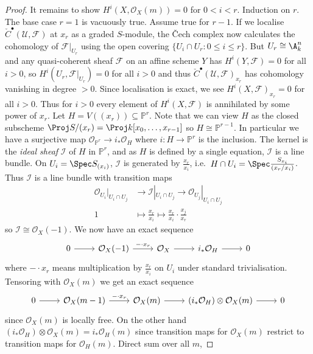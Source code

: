 \documentclass[a4paper]{article}
\renewcommand*{\P}{\mathbb{P}}
\newcommand{\sh}[1]{\mathcal{#1}} %
\begin{document}
\begin{proof}
  It remains to show \(H^i(X, \sh O_X(m)) = 0\) for \(0 < i < r\). Induction on \(r\). The base case \(r = 1\) is vacuously true. Assume true for \(r - 1\). If we localise \(\check C^\bullet(\mathcal U, \sh F)\) at \(x_r\) as a graded \(S\)-module, the Čech complex now calculates the cohomology of \(\sh F|_{U_r}\) using the open covering \(\{U_i \cap U_r: 0 \leq i \leq r\}\). But \(U_r \cong \A^n_k\) and any quasi-coherent sheaf \(\sh F\) on an affine scheme \(Y\) has \(H^i(Y, \sh F) = 0\) for all \(i > 0\), so \(H^i(U_r, \sh F|_{U_r}) = 0\) for all \(i > 0\) and thus \(\check C^\bullet(\mathcal U, \sh F)_{x_r}\) has cohomology vanishing in degree \(> 0\). Since localisation is exact, we see \(H^i(X, \sh F)_{x_r} = 0\) for all \(i > 0\). Thus for \(i > 0\) every element of \(H^i(X, \sh F)\) is annihilated by some power of \(x_r\). Let \(H = V((x_r)) \subseteq \P^r\). Note that we can view \(H\) as the closed subscheme \(\Proj S/(x_r) = \Proj k[x_0, \dots, x_{r - 1}]\) so \(H \cong \P^{r - 1}\). In particular we have a surjective map \(\sh O_{\P^r} \to i_* \sh O_H\) where \(i: H \to \P^r\) is the inclusion. The kernel is the \emph{ideal sheaf} \(\sh I\) of \(H\) in \(\P^r\), and as \(H\) is defined by a single equation, \(\sh I\) is a line bundle. On \(U_i = \Spec S_{(x_i)}\), \(\sh I\) is generated by \(\frac{x_r}{x_i}\), i.e.\ \(H \cap U_i = \Spec \frac{S_{x_i}}{(x_r/x_i)}\). Thus \(\sh I\) is a line bundle with transition maps
  \begin{align*}
    \sh O_{U_i}|_{U_i \cap U_j} &\to \sh I|_{U_i \cap U_j} \to \sh O_{U_j}|_{U_i \cap U_j} \\
    1 &\mapsto \frac{x_r}{x_i} \mapsto \frac{x_r}{x_i} \cdot \frac{x_j}{x_r}
  \end{align*}
  so \(\sh I \cong \sh O_X(-1)\). We now have an exact sequence
  \[
    \begin{tikzcd}
      0 \ar[r] & \sh O_X(-1) \ar[r, "- \cdot x_r"] & \sh O_X \ar[r] & i_* \sh O_H \ar[r] & 0
    \end{tikzcd}
  \]
  where \(- \cdot x_r\) means multiplication by \(\frac{x_r}{x_i}\) on \(U_i\) under standard trivialisation. Tensoring with \(\sh O_X(m)\) we get an exact sequence
  \[
    \begin{tikzcd}
      0 \ar[r] & \sh O_X(m - 1) \ar[r, "- \cdot x_r"] & \sh O_X(m) \ar[r] & (i_* \sh O_H) \otimes \sh O_X(m) \ar[r] & 0
    \end{tikzcd}
  \]
  since \(\sh O_X(m)\) is locally free. On the other hand \((i_* \sh O_H) \otimes \sh O_X(m) = i_* \sh O_H(m)\) since transition maps for \(\sh O_X(m)\) restrict to transition maps for \(\sh O_H(m)\). Direct sum over all \(m\),

\end{proof}
\end{document}
